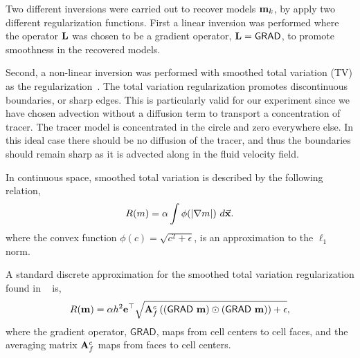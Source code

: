 \documentclass[leqno,onefignum,onetabnum]{siamltexmm}
\newcommand{\bfA}	{{\bf{A}}}
\newcommand{\bfL}	{{\bf{L}}}
\newcommand{\bfe}	{{\bf{e}}}
\newcommand{\bfm}	{{\bf{m}}}
\newcommand {\vx}    {\vec {\bf x}}
\newcommand{\GRADh}  {{\textsf{GRAD}}} %
\begin{document}
Two different inversions were carried out to recover models $\bfm_k$, by apply two different regularization functions.  
First a linear inversion was performed where the operator $\bfL$ was chosen to be a gradient operator,  $\bfL = \GRADh$, to promote smoothness in the recovered models.

Second, a non-linear inversion was performed with smoothed total variation (TV) as the  regularization~\cite{Ascher2006}.
 The total variation regularization promotes discontinuous boundaries, or sharp edges. This is particularly valid for our experiment since we have chosen advection without a diffusion term to transport a concentration of tracer. The tracer model is  concentrated in the circle and zero everywhere else. In this ideal case there should be no diffusion of the tracer, and thus the boundaries should remain sharp as it is advected along in the fluid velocity field.

In continuous space, smoothed total variation is described by the following relation,
\begin{equation}
		R(m) = \alpha \int  \phi(|\nabla m|) \ d\vx.
\end{equation} 
where the convex function $\phi(c) = \sqrt{c^2 + \epsilon}$, is an approximation to the $\ell_1$ norm. 

A standard discrete 
approximation for the smoothed total variation regularization found in ~\cite{Ascher2006} is, 
\begin{equation}
\label{regsd}
R(\bfm) = \alpha h^2 \bfe^{\top} \sqrt{ \bfA_{f}^{c} \left( (\GRADh\ \bfm) \odot (\GRADh\ \bfm) \right)  + \epsilon},
\end{equation}
where the  gradient operator, $\GRADh$,   maps from cell centers to cell faces, and the averaging matrix $\bfA_{f}^{c}$ maps from faces to cell centers. 
\end{document}
